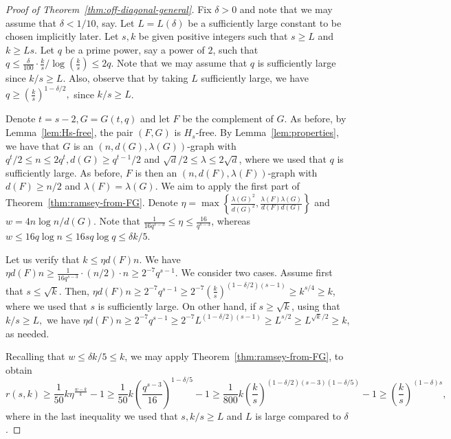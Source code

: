 \documentclass{article}
\theoremstyle{plain}
\theoremstyle{definition}
\begin{document}
\begin{proof}[Proof of Theorem~\ref{thm:off-diagonal-general}]
    Fix $\delta > 0$ and note that we may assume that $\delta < 1/10$, say. Let $L = L(\delta)$ be a sufficiently large constant to be chosen implicitly later. Let $s, k$ be given positive integers such that $s \ge L$ and $k \ge Ls$. Let $q$ be a prime power, say a power of $2$, such that $q \le \frac{\delta}{100} \cdot \frac{k}{s} / \log\left( \frac{k}{s} \right) \le 2q$. Note that we may assume that $q$ is sufficiently large since $k/s \ge L$. Also, observe that by taking $L$ sufficiently large, we have $q \ge \left( \frac{k}{s} \right)^{1 - \delta / 2},$ since $k/s \ge L$.
    
    Denote $t = s-2, G = G(t, q)$ and let $F$ be the complement of $G$. As before, by Lemma~\ref{lem:Hs-free}, the pair $(F, G)$ is $H_s$-free. By Lemma~\ref{lem:properties}, we have that $G$ is an $(n, d(G), \lambda(G))$-graph with $q^{t}/2 \le n \le 2 q^t, d(G) \ge q^{t-1} / 2$ and $\sqrt{d} / 2 \le \lambda \le 2 \sqrt{d}$, where we used that $q$ is sufficiently large. As before, $F$ is then an $(n, d(F), \lambda(F))$-graph with $d(F) \ge n/2$ and $\lambda(F) = \lambda(G)$. We aim to apply the first part of Theorem~\ref{thm:ramsey-from-FG}. Denote $\eta = \max\left\{ \frac{\lambda(G)^2}{d(G)^2}, \frac{\lambda(F) \lambda(G)}{d(F) d(G)} \right\}$ and $w = 4 n \log n / d(G)$. Note that $\frac{1}{16 q^{s-3}} \le \eta \le \frac{16}{q^{s-3}}$, whereas $w \le 16 q \log n \le 16 s q \log q \le \delta k / 5$.

    Let us verify that $k \le \eta d(F) n$. We have $\eta d(F) n \ge \frac{1}{16 q^{s-3}}\cdot (n/2) \cdot n \ge 2^{-7} q^{s-1}$. We consider two cases. Assume first that $s \le \sqrt{k}$. Then, $\eta d(F) n \ge 2^{-7} q^{s-1} \ge 2^{-7} \left( \frac{k}{s} \right)^{(1-\delta/2) (s-1)} \ge k^{s/4} \ge k$, where we used that $s$ is sufficiently large. On other hand, if $s \ge \sqrt{k}$, using that $k/s \ge L,$ we have $\eta d(F) n \ge 2^{-7} q^{s-1} \ge 2^{-7} L^{(1-\delta/2)(s-1)} \ge L^{s/2} \ge L^{\sqrt{k} / 2} \ge k$, as needed.
    
    Recalling that $w \le \delta k / 5 \le k$, we may apply Theorem~\ref{thm:ramsey-from-FG}, to obtain
    \[ r(s, k) \ge \frac{1}{50} k \eta^{\frac{w-k}{k}} - 1 \ge \frac{1}{50} k \left(\frac{q^{s-3}}{16}\right)^{1 - \delta/5} - 1 \ge \frac{1}{800} k \left(\frac{k}{s}\right)^{(1 - \delta/2)(s-3) (1- \delta/5)} - 1 \ge \left(\frac{k}{s}\right)^{(1 - \delta) s}, \]
    where in the last inequality we used that $s, k/s \ge L$ and $L$ is large compared to $\delta$.
\end{proof}
\end{document}
